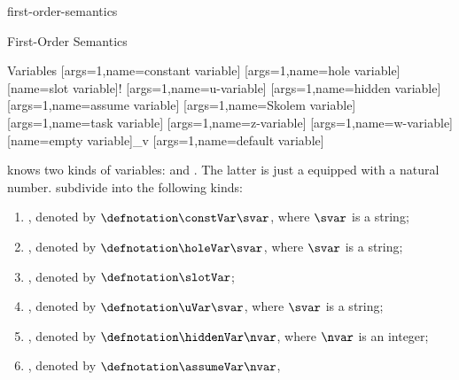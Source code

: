 \documentclass{stex}
\begin{document}
\begin{smodule}{first-order-semantics}
\begin{sfragment}[id=sec:first-order-semantics]{First-Order Semantics}
  \begin{sfragment}[id=sec:variables]{Variables}
    [args=1,name=constant variable]{}
    [args=1,name=hole variable]{}
    [name=slot variable]{\textsf{!}}
    [args=1,name=u-variable]{}
    [args=1,name=hidden variable]{}
    [args=1,name=assume variable]{}
    [args=1,name=Skolem variable]{}
    [args=1,name=task variable]{}
    [args=1,name=z-variable]{}
    [args=1,name=w-variable]{}
    [name=empty variable]{\epsilon_{\textsf{v}}}
    [args=1,name=default variable]{}
    \begin{sparagraph}[style=symdoc,for={variable name,variable declaration,constVar,holeVar,slotVar,uVar,hiddenVar,
      assumeVar,skolemVar,taskVar,zVar,wVar,emptyVar,defaultVar}]
      \Naproche knows two kinds of variables:  and
      .
      The latter is just a  equipped with a natural number.
       subdivide into the following kinds:
      \begin{enumerate}
        \item {}, denoted by $\defnotation\constVar\svar$,
          where $\svar$ is a string;
        \item {}, denoted by $\defnotation\holeVar\svar$,
          where $\svar$ is a string;
        \item {}, denoted by $\defnotation\slotVar$;
        \item {}, denoted by $\defnotation\uVar\svar$,
          where $\svar$ is a string;
        \item {}, denoted by $\defnotation\hiddenVar\nvar$,
          where $\nvar$ is an integer;
        \item {}, denoted by $\defnotation\assumeVar\nvar$,

\end{enumerate}
\end{sparagraph}
\end{sfragment}
\end{sfragment}
\end{smodule}
\end{document}
